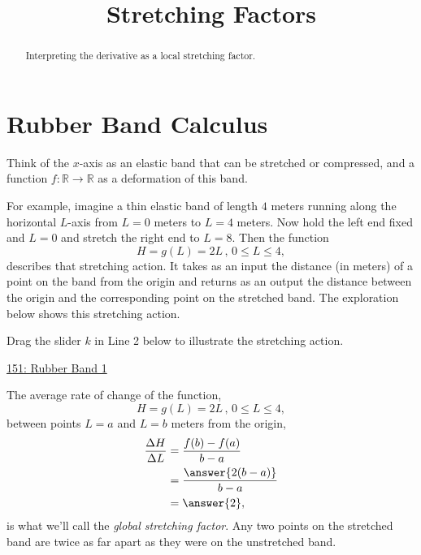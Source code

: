 \documentclass{ximera}
\title{Stretching Factors}
\begin{document}
\begin{abstract}
Interpreting the derivative as a local stretching factor.
\end{abstract}
\maketitle

\section{Rubber Band Calculus}

Think of the $x$-axis as an elastic band that can be stretched or compressed, and a function $f : \mathbb{R}\to\mathbb{R}$ as a deformation of this band. %

For example, imagine a thin elastic band of length $4$ meters running along the horizontal $L$-axis from $L=0$ meters to $L=4$ meters.  Now hold the left end fixed and $L=0$ and stretch the right end to $L=8$. Then the function
\[
      H = g(L) = 2L \, , \, 0\leq L \leq 4 ,
\]
describes that stretching action. It takes as an input the distance (in meters) of a point on the band from the origin and returns as an output the distance between the origin and the corresponding point on the stretched band. The exploration below shows this stretching action.

\begin{exploration} \label{Ex:98f3rgafgbb}
Drag the slider $k$ in Line 2 below to illustrate the stretching action.

\begin{onlineOnly}
    \begin{center}
\end{center}
\end{onlineOnly}

\href{https://www.desmos.com/calculator/qejivz36ui}{151: Rubber Band 1}

\end{exploration}

The average rate of change of the function,
\[
      H = g(L) = 2L \, , \, 0\leq L \leq 4 ,
\]
between points $L=a$ and $L=b$ meters from the origin,
\begin{align*}
  \frac{\Delta H}{\Delta L} &= \frac{f(b) - f(a)}{b-a} \\
                                       &= \frac{\answer{2(b-a)}}{b-a} \\
                                       &= \answer{2},
\end{align*}
is what we'll call the \emph{global stretching factor}. Any two points on the stretched band are twice as far apart as they were on the unstretched band.
\end{document}
